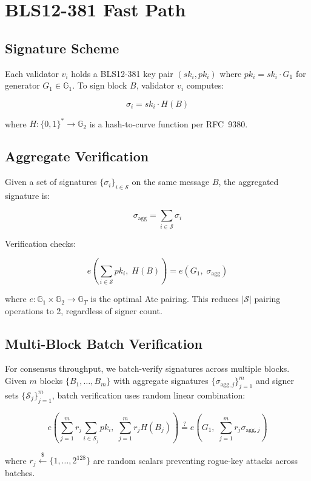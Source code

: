 \section{BLS12-381 Fast Path}


\subsection{Signature Scheme}

Each validator $v_i$ holds a BLS12-381 key pair $(sk_i, pk_i)$ where $pk_i = sk_i \cdot G_1$ for generator $G_1 \in \mathbb{G}_1$. To sign block $B$, validator $v_i$ computes:

\begin{equation}
\sigma_i = sk_i \cdot H(B)
\end{equation}

where $H: \{0,1\}^* \rightarrow \mathbb{G}_2$ is a hash-to-curve function per RFC~9380.

\subsection{Aggregate Verification}

Given a set of signatures $\{\sigma_i\}_{i \in \mathcal{S}}$ on the same message $B$, the aggregated signature is:

\begin{equation}
\sigma_{\text{agg}} = \sum_{i \in \mathcal{S}} \sigma_i
\end{equation}

Verification checks:

\begin{equation}
e\!\left(\sum_{i \in \mathcal{S}} pk_i,\; H(B)\right) = e(G_1,\; \sigma_{\text{agg}})
\end{equation}

where $e: \mathbb{G}_1 \times \mathbb{G}_2 \rightarrow \mathbb{G}_T$ is the optimal Ate pairing. This reduces $|\mathcal{S}|$ pairing operations to 2, regardless of signer count.

\subsection{Multi-Block Batch Verification}

For consensus throughput, we batch-verify signatures across multiple blocks. Given $m$ blocks $\{B_1, \ldots, B_m\}$ with aggregate signatures $\{\sigma_{\text{agg},j}\}_{j=1}^{m}$ and signer sets $\{\mathcal{S}_j\}_{j=1}^{m}$, batch verification uses random linear combination:

\begin{equation}
e\!\left(\sum_{j=1}^{m} r_j \sum_{i \in \mathcal{S}_j} pk_i,\; \sum_{j=1}^{m} r_j H(B_j)\right) \stackrel{?}{=} e\!\left(G_1,\; \sum_{j=1}^{m} r_j \sigma_{\text{agg},j}\right)
\end{equation}

where $r_j \xleftarrow{\$} \{1, \ldots, 2^{128}\}$ are random scalars preventing rogue-key attacks across batches.

